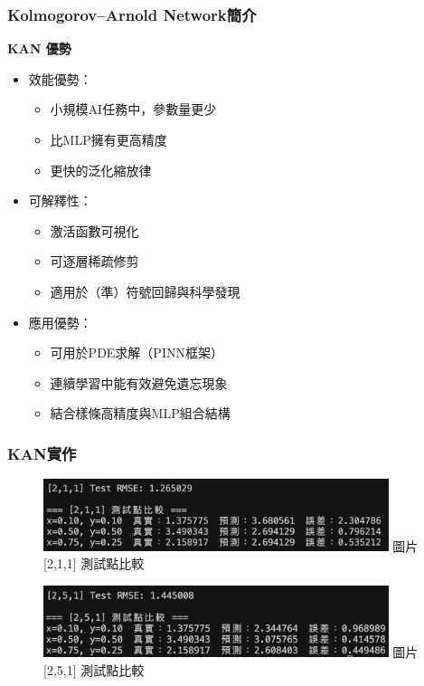 \documentclass{beamer}
\begin{document}
\begin{frame}
    \frametitle{Kolmogorov–Arnold Network簡介}
    \centering
    \textbf{KAN 優勢}\\[0.1cm]
    \begin{itemize}
        \item 效能優勢：
        \begin{itemize}
            \item 小規模AI任務中，參數量更少
            \item 比MLP擁有更高精度
            \item 更快的泛化縮放律
        \end{itemize}
        \item 可解釋性：
        \begin{itemize}
            \item 激活函數可視化
            \item 可逐層稀疏修剪
            \item 適用於（準）符號回歸與科學發現
        \end{itemize}
        \item 應用優勢：
        \begin{itemize}
            \item 可用於PDE求解（PINN框架）
            \item 連續學習中能有效避免遺忘現象
            \item 結合樣條高精度與MLP組合結構
        \end{itemize}
    \end{itemize}
\end{frame}

\begin{frame}
    \frametitle{KAN實作}
    \begin{figure}
        \centering
        \begin{minipage}{\textwidth}
            \includegraphics[width=0.9\textwidth,height=0.4\textheight,keepaspectratio]{figures/211_3.jpg}
            \centering
            圖片[2,1,1] 測試點比較
        \end{minipage}
        
        \vspace{0.5em}
        
        \begin{minipage}{\textwidth}
            \includegraphics[width=0.9\textwidth,height=0.4\textheight,keepaspectratio]{figures/251.jpg}
            \centering
            圖片[2,5,1] 測試點比較
        \end{minipage}
    \end{figure}
\end{frame}
\end{document}
